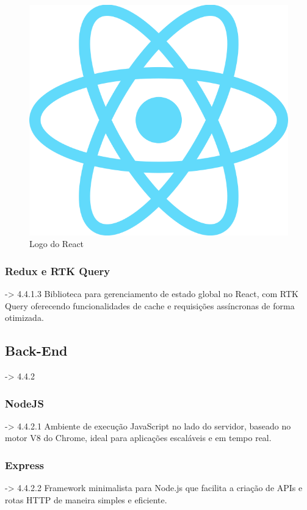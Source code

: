 \begin{figure}[htb]
  \centering
  \includegraphics[width=\textwidth]{cap04-desenvolvimento/images/4-4-1-1-react}
  \caption{Logo do React}
  \label{fig:diagrama-implantacao}
\end{figure}

\subsubsection{Redux e RTK Query} -> 4.4.1.3
Biblioteca para gerenciamento de estado global no React, com RTK Query oferecendo funcionalidades de cache e requisições assíncronas de forma otimizada.

\subsection{Back-End} -> 4.4.2

\subsubsection{NodeJS} -> 4.4.2.1
Ambiente de execução JavaScript no lado do servidor, baseado no motor V8 do Chrome, ideal para aplicações escaláveis e em tempo real.

\subsubsection{Express} -> 4.4.2.2
Framework minimalista para Node.js que facilita a criação de APIs e rotas HTTP de maneira simples e eficiente.

